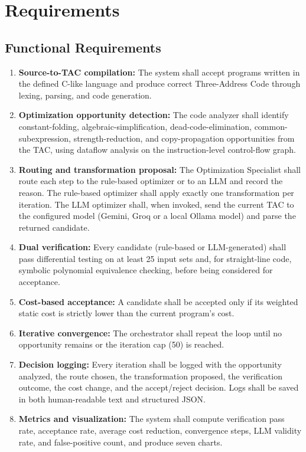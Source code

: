 \documentclass[12pt,a4paper]{report}
\begin{document}
\section{Requirements}

\subsection{Functional Requirements}

\begin{enumerate}[leftmargin=2cm]
  \item \textbf{Source-to-TAC compilation:} The system shall accept programs written in the defined C-like language and produce correct Three-Address Code through lexing, parsing, and code generation.
  \item \textbf{Optimization opportunity detection:} The code analyzer shall identify constant-folding, algebraic-simplification, dead-code-elimination, common-subexpression, strength-reduction, and copy-propagation opportunities from the TAC, using dataflow analysis on the instruction-level control-flow graph.
  \item \textbf{Routing and transformation proposal:} The Optimization Specialist shall route each step to the rule-based optimizer or to an LLM and record the reason. The rule-based optimizer shall apply exactly one transformation per iteration. The LLM optimizer shall, when invoked, send the current TAC to the configured model (Gemini, Groq or a local Ollama model) and parse the returned candidate.
  \item \textbf{Dual verification:} Every candidate (rule-based or LLM-generated) shall pass differential testing on at least 25 input sets and, for straight-line code, symbolic polynomial equivalence checking, before being considered for acceptance.
  \item \textbf{Cost-based acceptance:} A candidate shall be accepted only if its weighted static cost is strictly lower than the current program's cost.
  \item \textbf{Iterative convergence:} The orchestrator shall repeat the loop until no opportunity remains or the iteration cap (50) is reached.
  \item \textbf{Decision logging:} Every iteration shall be logged with the opportunity analyzed, the route chosen, the transformation proposed, the verification outcome, the cost change, and the accept/reject decision. Logs shall be saved in both human-readable text and structured JSON.
  \item \textbf{Metrics and visualization:} The system shall compute verification pass rate, acceptance rate, average cost reduction, convergence steps, LLM validity rate, and false-positive count, and produce seven charts.
\end{enumerate}
\end{document}
